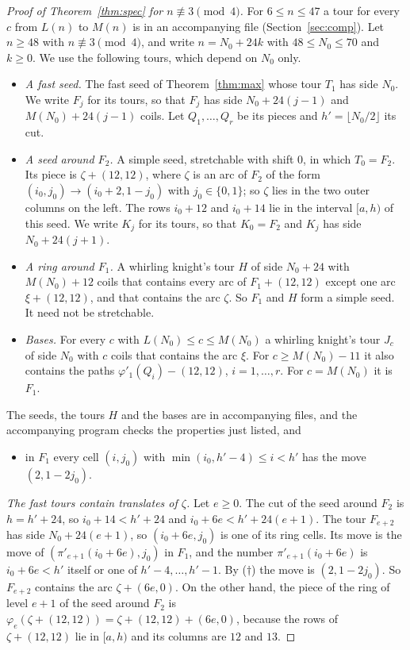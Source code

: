 \documentclass[11pt]{amsart}
\theoremstyle{remark}
\begin{document}
\begin{proof}[Proof of Theorem~\ref{thm:spec} for $n\not\equiv3\pmod 4$]
For $6\le n\le47$ a tour for every $c$ from $L(n)$ to $M(n)$ is in an accompanying file
(Section~\ref{sec:comp}). Let $n\ge48$ with $n\not\equiv3\pmod 4$, and write $n=N_0+24k$ with $48\le N_0\le70$ and
$k\ge0$. We use the following tours, which depend on $N_0$ only.
\begin{itemize}
\item \emph{A fast seed.} The fast seed of Theorem~\ref{thm:max} whose tour $T_1$ has side $N_0$. We write $F_j$ for
its tours, so that $F_j$ has side $N_0+24(j-1)$ and $M(N_0)+24(j-1)$ coils. Let $Q_1,\dots,Q_r$ be its pieces and
$h'=\lfloor N_0/2\rfloor$ its cut.
\item \emph{A seed around $F_2$.} A simple seed, stretchable with shift $0$, in which $T_0=F_2$. Its piece is
$\zeta+(12,12)$, where $\zeta$ is an arc of $F_2$ of the form $(i_0,j_0)\to(i_0+2,1-j_0)$ with $j_0\in\{0,1\}$; so
$\zeta$ lies in the two outer columns on the left. The rows $i_0+12$ and $i_0+14$ lie in the interval $[a,h)$ of
this seed. We write $K_j$ for its tours, so that $K_0=F_2$ and $K_j$ has side $N_0+24(j+1)$.
\item \emph{A ring around $F_1$.} A whirling knight's tour $H$ of side $N_0+24$ with $M(N_0)+12$ coils that contains
every arc of $F_1+(12,12)$ except one arc $\xi+(12,12)$, and that contains the arc $\zeta$. So $F_1$ and $H$ form a
simple seed. It need not be stretchable.
\item \emph{Bases.} For every $c$ with $L(N_0)\le c\le M(N_0)$ a whirling knight's tour $J_c$ of side $N_0$ with $c$
coils that contains the arc $\xi$. For $c\ge M(N_0)-11$ it also contains the paths
$\varphi'_1(Q_i)-(12,12)$, $i=1,\dots,r$. For $c=M(N_0)$ it is $F_1$.
\end{itemize}
The seeds, the tours $H$ and the bases are in accompanying files, and the accompanying program checks the
properties just listed, and
\begin{itemize}
\item[($\dagger$)] in $F_1$ every cell $(i,j_0)$ with $\min(i_0,h'-4)\le i<h'$ has the move $(2,1-2j_0)$.
\end{itemize}

\emph{The fast tours contain translates of $\zeta$.} Let $e\ge0$. The cut of the seed around $F_2$ is $h=h'+24$,
so $i_0+14<h'+24$ and $i_0+6e<h'+24(e+1)$. The tour $F_{e+2}$ has side $N_0+24(e+1)$, so
$(i_0+6e,j_0)$ is one of its ring cells. Its move is the move of $(\pi'_{e+1}(i_0+6e),j_0)$ in $F_1$, and the number
$\pi'_{e+1}(i_0+6e)$ is $i_0+6e<h'$ itself or one of $h'-4,\dots,h'-1$. By ($\dagger$) the move is $(2,1-2j_0)$. So
$F_{e+2}$ contains the arc $\zeta+(6e,0)$. On the other hand, the piece of the ring of level $e+1$ of the seed
around $F_2$ is $\varphi_e(\zeta+(12,12))=\zeta+(12,12)+(6e,0)$, because the rows of $\zeta+(12,12)$ lie in $[a,h)$
and its columns are $12$ and $13$.


\end{proof}
\end{document}
